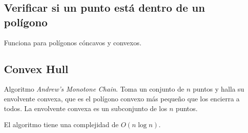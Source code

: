\documentclass{article}
\begin{document}
\begin{multicols}{2}
\subsection{Verificar si un punto está dentro de un polígono}
Funciona para polígonos cóncavos y convexos.


\subsection{Convex Hull}
Algoritmo \emph{Andrew's Monotone Chain}. Toma un conjunto de \( n \) puntos y halla su envolvente convexa, que es el polígono convexo más pequeño que los encierra a todos. La envolvente convexa es un subconjunto de los \( n \) puntos.

El algoritmo tiene una complejidad de \( O( n \log n ) \).



\end{multicols}	
\end{document}
